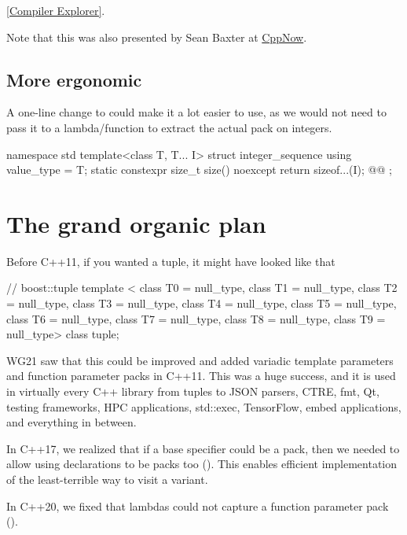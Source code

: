 \documentclass{wg21}
\begin{document}
\href{https://compiler-explorer.com/z/x3fde3f5f}{[Compiler Explorer]}.

Note that this was also presented by Sean Baxter at \href{https://www.youtube.com/watch?v=15j4bkipuAg&t=783s}{CppNow}.


\subsection{More ergonomic }

A one-line change to 
could make it a lot easier to use, as we would not need to pass it to a lambda/function to extract the actual
pack on integers.

\begin{colorblock}
namespace std {
    template<class T, T... I> struct integer_sequence {
        using value_type = T;
        static constexpr size_t size() noexcept { return sizeof...(I); }
        @@
    };
}
\end{colorblock}

\section{The grand organic plan}

Before C++11, if you wanted a tuple, it might have looked like that
\begin{colorblock}
// boost::tuple
template <
class T0 = null_type, class T1 = null_type, class T2 = null_type,
class T3 = null_type, class T4 = null_type, class T5 = null_type,
class T6 = null_type, class T7 = null_type, class T8 = null_type,
class T9 = null_type>
class tuple;
\end{colorblock}

WG21 saw that this could be improved and  added variadic template parameters and function parameter packs in C++11.
This was a huge success, and it is used in virtually every C++ library from tuples to JSON parsers, CTRE, fmt, Qt, testing frameworks,
HPC applications, std::exec, TensorFlow, embed applications, and everything in between.

In C++17, we realized that if a base specifier could be a pack, then we needed to allow using declarations to be packs too ().
This enables efficient implementation of the least-terrible way to visit a variant.

In C++20, we fixed that lambdas could not capture a function parameter pack ().
\end{document}
